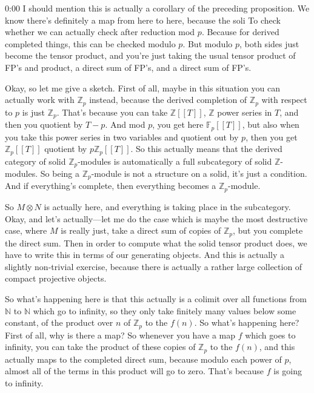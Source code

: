 \begin{unfinished}{0:00}
I should mention this is actually a corollary of the preceding proposition. We know there's definitely a map from here to here, because the soli
To check whether we can actually check after reduction mod $p$. Because for derived completed things, this can be checked modulo $p$. But modulo $p$, both sides just become the tensor product, and you're just taking the usual tensor product of FP's and product, a direct sum of FP's, and a direct sum of FP's.

Okay, so let me give a sketch. First of all, maybe in this situation you can actually work with $\mathbb{Z}_p$ instead, because the derived completion of $\mathbb{Z}_p$ with respect to $p$ is just $\mathbb{Z}_p$. That's because you can take $\mathbb{Z}[[T]]$, $\mathbb{Z}$ power series in $T$, and then you quotient by $T-p$. And mod $p$, you get here $\mathbb{F}_p[[T]]$, but also when you take this power series in two variables and quotient out by $p$, then you get $\mathbb{Z}_p[[T]]$ quotient by $p\mathbb{Z}_p[[T]]$. So this actually means that the derived category of solid $\mathbb{Z}_p$-modules is automatically a full subcategory of solid $\mathbb{Z}$-modules. So being a $\mathbb{Z}_p$-module is not a structure on a solid, it's just a condition. And if everything's complete, then everything becomes a $\mathbb{Z}_p$-module.

So $M \otimes N$ is actually here, and everything is taking place in the subcategory. Okay, and let's actually---let me do the case which is maybe the most destructive case, where $M$ is really just, take a direct sum of copies of $\mathbb{Z}_p$, but you complete the direct sum. Then in order to compute what the solid tensor product does, we have to write this in terms of our generating objects. And this is actually a slightly non-trivial exercise, because there is actually a rather large collection of compact projective objects.

So what's happening here is that this actually is a colimit over all functions from $\mathbb{N}$ to $\mathbb{N}$ which go to infinity, so they only take finitely many values below some constant, of the product over $n$ of $\mathbb{Z}_p$ to the $f(n)$. So what's happening here? First of all, why is there a map? So whenever you have a map $f$ which goes to infinity, you can take the product of these copies of $\mathbb{Z}_p$ to the $f(n)$, and this actually maps to the completed direct sum, because modulo each power of $p$, almost all of the terms in this product will go to zero. That's because $f$ is going to infinity.


\end{unfinished}
